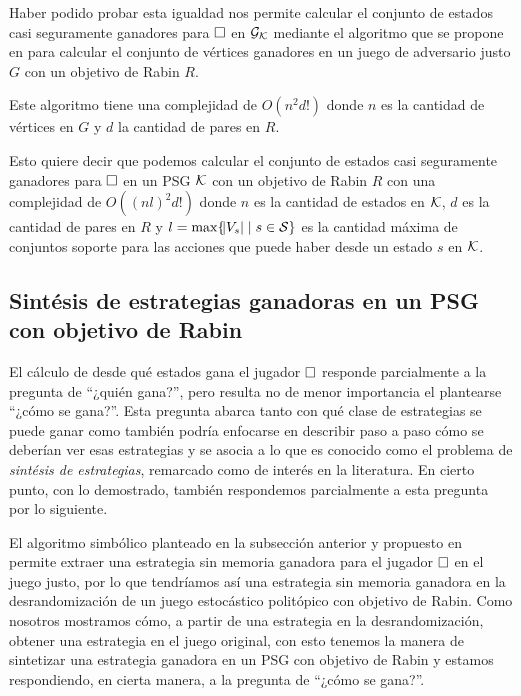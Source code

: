 Haber podido probar esta igualdad nos permite calcular el conjunto de estados
casi seguramente ganadores para $\square$ en $\mathcal{G}_{\mathcal{K}}$ mediante el algoritmo que se
propone en \cite{Banerjee} para calcular el conjunto de vértices ganadores en
un juego de adversario justo $G$ con un objetivo de Rabin $R$.

Este algoritmo tiene una complejidad de $O(n^2 d!)$ donde $n$ es la cantidad de
vértices en $G$ y $d$ la cantidad de pares en $R$.

Esto quiere decir que podemos calcular el conjunto de estados casi seguramente
ganadores para $\square$ en un PSG $\mathcal{K}$ con un objetivo de Rabin $R$ con una
complejidad de $O((n l)^2 d! )$ donde $n$ es la cantidad de estados en $\mathcal{K}$,
$d$ es la cantidad de pares en $R$ y $l = \max \{\abs{V_s} \mid s \in \mathcal{S} \}$
es la cantidad máxima de conjuntos soporte para las acciones que puede haber
desde un estado $s$ en $\mathcal{K}$.

\subsection*{Sintésis de estrategias ganadoras en un PSG con objetivo de Rabin}

El cálculo de desde qué estados gana el jugador $\square$ responde parcialmente a
la pregunta de ``¿quién gana?'', pero resulta no de menor importancia el
plantearse ``¿cómo se gana?''. Esta pregunta abarca tanto con qué clase de
estrategias se puede ganar como también podría enfocarse en describir paso a
paso cómo se deberían ver esas estrategias y se asocia a lo que es conocido
como el problema de \textit{sintésis de estrategias}, remarcado como de interés
en la literatura. En cierto punto, con lo demostrado, también respondemos
parcialmente a esta pregunta por lo siguiente.

El algoritmo simbólico planteado en la subsección anterior y propuesto en
\cite{Banerjee} permite extraer una estrategia sin memoria ganadora para el
jugador $\square$ en el juego justo, por lo que tendríamos así una estrategia sin
memoria ganadora en la desrandomización de un juego estocástico politópico con
objetivo de Rabin. Como nosotros mostramos cómo, a partir de una estrategia en
la desrandomización, obtener una estrategia en el juego original, con esto
tenemos la manera de sintetizar una estrategia ganadora en un PSG con objetivo
de Rabin y estamos respondiendo, en cierta manera, a la pregunta de ``¿cómo se
gana?''.


